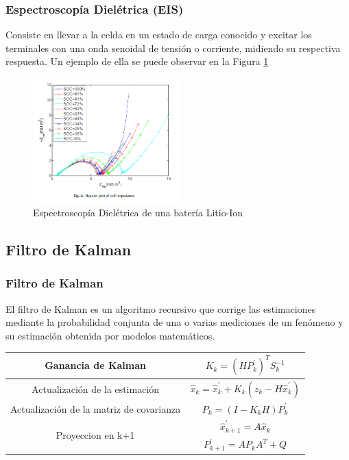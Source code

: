 \documentclass[10pt]{beamer}
\theoremstyle{remark}
\theoremstyle{definition}
\begin{document}
\begin{frame}[allowframebreaks]
  \frametitle{Espectroscopía Dielétrica (EIS)}
  Consiste en llevar a la celda en un estado de carga conocido y excitar los
  terminales con una onda senoidal de tensión o corriente, midiendo su respectiva
  respuesta. Un ejemplo de ella se puede observar en la Figura \ref{fig:nyq_eis}

  \begin{figure}[h!]
	\centering
	\includegraphics[width=0.5\textwidth]{./images/EIS_Nyquist.png}
	\caption{Espectroscopía Dielétrica de una batería Litio-Ion}
	\label{fig:nyq_eis}
  \end{figure}
\end{frame}

\subsection{Filtro de Kalman}

\begin{frame}[allowframebreaks]
  \frametitle{Filtro de Kalman}

  El filtro de Kalman es un algoritmo recursivo que corrige las estimaciones
  mediante la probabilidad conjunta de una o varias mediciones de un fenómeno y
  su estimación obtenida por modelos matemáticos.

  \begin{table}[h!]
	\centering
	\begin{tabular}{|c|c|}
	  \hline
	  \rule{0pt}{4ex}	Ganancia de Kalman 							& $K_k = (H P^\prime_k)^T S_k^{-1}$  \\ \hline
	  \rule{0pt}{4ex}	Actualización de la estimación			    &  $\hat{x}_k = \hat{x}^\prime_k + K_k (z_k - H\hat{x}^\prime_k)$\\ \hline
	  \rule{0pt}{4ex}	Actualización de la matriz de covarianza    & $P_k = (I - K_k H) P^\prime_k$ \\ \hline
	  \multirow{2}{*}{Proyeccion en k+1}        		  			& \rule{0pt}{4ex} $\hat{x}^\prime_{k+1} = A \hat{x}_k$ \\ \cline{2-2}
	  & \rule{0pt}{4ex} $P^\prime_{k+1} = A P_k A^{T} + Q$ \\ \hline
	\end{tabular}
	\label{Ecuaciones_Kalman}
  \end{table}
\end{frame}
\end{document}
